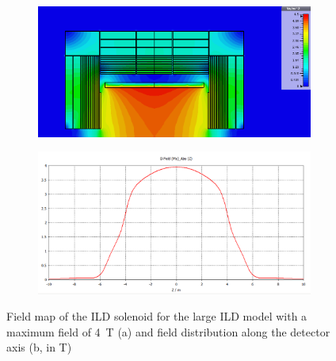 \begin{figure}[t]
\begin{center}
\begin{subfigure}{0.75\hsize} \includegraphics[width=\textwidth]{Integration/fig/field_nominal_4.png}
\caption{ \label{ild:fig:magnet_nominal_map}}
 \end{subfigure}
\hspace{0.03\textwidth}
\begin{subfigure}{0.75\hsize} \includegraphics[width=\textwidth]{Integration/fig/field_nominal_4_plot.png}
\caption{  \label{ild:fig:magnet_nominal_field}}
 \end{subfigure}
\end{center}
\caption{Field map of the ILD solenoid for the large ILD model with a maximum field of 4~T (a) and field distribution along the detector axis (b, in T)~\cite{ild:bib:Magnet_Simulations}}
\label{ILD:fig:magnet_nominal}
\end{figure}

